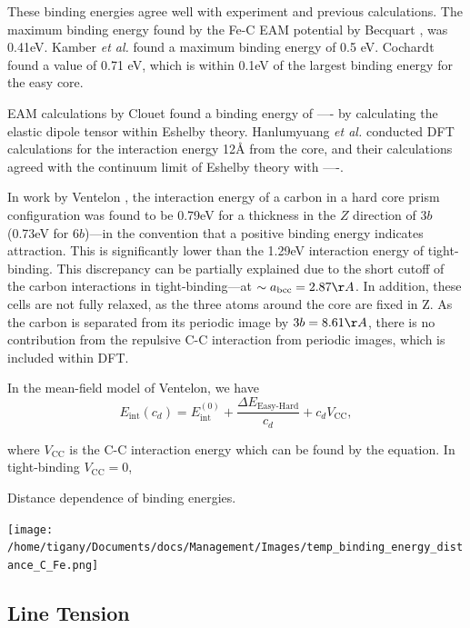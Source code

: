 \documentclass[a4paper]{article}
\begin{document}
{These binding energies agree well with experiment and previous
calculations. The maximum binding energy found by the Fe-C EAM
potential by Becquart \cite{Becquart2007}, was 0.41eV. Kamber
\emph{et al.} found a maximum binding energy of 0.5 eV. Cochardt
found a value of 0.71 eV, which is within 0.1eV of the largest
binding energy for the easy core. 

EAM calculations by Clouet \cite{Clouet2008} found a binding energy of ---- by calculating the
elastic dipole tensor within Eshelby theory. 
Hanlumyuang \emph{et al.} \cite{Hanlumyuang2010} conducted DFT calculations for the interaction energy 12\AA{} from the core,
and their calculations agreed with the continuum limit of Eshelby theory with ----. 


In work by Ventelon \cite{Ventelon2015}, the interaction energy of a carbon in a hard
core prism configuration was found to be 0.79eV for a thickness in the \(Z\) direction of 3\(b\) (0.73eV for \(6b\))---in the
convention that a positive binding energy indicates attraction. This is significantly lower than
the 1.29eV interaction energy of tight-binding. This discrepancy can be
partially explained due to the short cutoff of the carbon interactions in tight-binding---at
\(\sim a_{\text{bcc}} = 2.87 \AA\). In addition, these cells are not fully relaxed, as the three
atoms around the core are fixed in Z. As the carbon is separated from its periodic image by \(3b =
    8.61\AA\), there is no contribution from the repulsive C-C interaction from periodic images,
which is included within DFT.


In the mean-field model of Ventelon, we have
\[ E_{\text{int}}( c_d ) = E^{(0)}_{\text{int}} + \frac{\Delta E_{\text{Easy-Hard}}}{c_d} + c_d V_{\text{CC}} , \]

where \(V_{\text{CC}}\) is the C-C interaction energy which can be found by the equation. In
tight-binding \(V_{\text{CC}}= 0\), 



Distance dependence of binding energies. 

\begin{center}
\texttt{[image: /home/tigany/Documents/docs/Management/Images/temp\_binding\_energy\_distance\_C\_Fe.png]}
\end{center}



\subsection{Line Tension}
\label{sec:org040e751}


}
\end{document}
